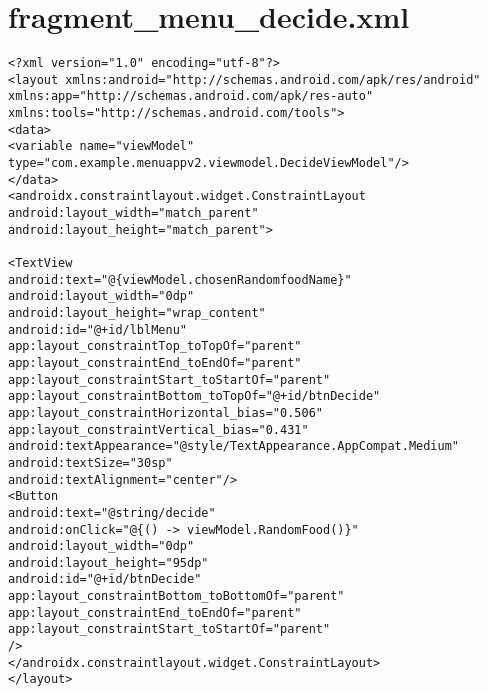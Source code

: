 \section{fragment\_menu\_decide.xml}
\begin{lstlisting}[caption= fragment\_menu\_decide.xml]
<?xml version="1.0" encoding="utf-8"?>
<layout xmlns:android="http://schemas.android.com/apk/res/android"
xmlns:app="http://schemas.android.com/apk/res-auto"
xmlns:tools="http://schemas.android.com/tools">
<data>
<variable name="viewModel" type="com.example.menuappv2.viewmodel.DecideViewModel"/>
</data>
<androidx.constraintlayout.widget.ConstraintLayout
android:layout_width="match_parent"
android:layout_height="match_parent">

<TextView
android:text="@{viewModel.chosenRandomfoodName}"
android:layout_width="0dp"
android:layout_height="wrap_content"
android:id="@+id/lblMenu"
app:layout_constraintTop_toTopOf="parent"
app:layout_constraintEnd_toEndOf="parent"
app:layout_constraintStart_toStartOf="parent"
app:layout_constraintBottom_toTopOf="@+id/btnDecide"
app:layout_constraintHorizontal_bias="0.506"
app:layout_constraintVertical_bias="0.431"
android:textAppearance="@style/TextAppearance.AppCompat.Medium"
android:textSize="30sp"
android:textAlignment="center"/>
<Button
android:text="@string/decide"
android:onClick="@{() -> viewModel.RandomFood()}"
android:layout_width="0dp"
android:layout_height="95dp"
android:id="@+id/btnDecide"
app:layout_constraintBottom_toBottomOf="parent" app:layout_constraintEnd_toEndOf="parent"
app:layout_constraintStart_toStartOf="parent"
/>
</androidx.constraintlayout.widget.ConstraintLayout>
</layout>
\end{lstlisting}

